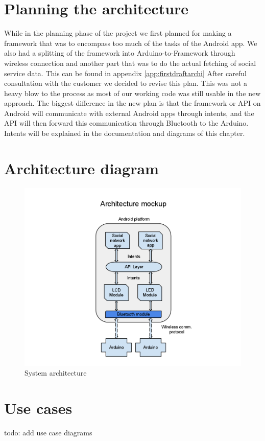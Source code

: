 \section{Planning the architecture}

While in the planning phase of the project we first planned for making a framework that was to
encompass too much of the tasks of the Android app. We also had a splitting of the framework into
Arduino-to-Framework through wireless connection and another part that was to do the actual fetching
of social service data. This can be found in appendix \ref{app:firstdraftarchi}
After careful consultation with the customer we decided to revise this plan. This was not a heavy blow
to the process as most of our working code was still usable in the new approach. The biggest difference
in the new plan is that the framework or API on Android will communicate with external Android apps through intents,
and the API will then forward this communication through Bluetooth to the Arduino. Intents will be explained
in the documentation and diagrams of this chapter.

\newpage
\section{Architecture diagram}
\begin{figure}
\centering \includegraphics[scale=0.50]{img/architecture.png}
\caption{System architecture}
\label{fig:architecture}
\end{figure}
\section{Use cases}
todo: add use case diagrams